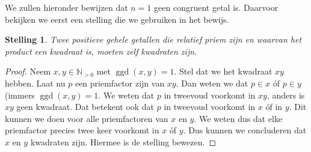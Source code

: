 \documentclass[12pt,reqno]{article}
\newcommand*{\NO}{\ensuremath{\mathbb{N}_{>0}}}
\theoremstyle{theorem}
\newtheorem{theorem}{Stelling}
\theoremstyle{definition}
\DeclareMathOperator{\ggd}{ggd}
\begin{document}
	We zullen hieronder bewijzen dat $n=1$ geen congruent getal is. Daarvoor bekijken we eerst een stelling die we gebruiken in het bewijs.
	\begin{theorem}\label{1:hulp}
		Twee positieve gehele getallen die relatief priem zijn en waarvan het product een kwadraat is, moeten zelf kwadraten zijn.
	\end{theorem}
	\begin{proof}
		Neem $x,y\in\NO$ met $\ggd(x,y) = 1$. Stel dat we het kwadraat $xy$ hebben. Laat nu $p$ een priemfactor zijn van $xy$. Dan weten we dat $p\in x$ \'of $p\in y$ (immers $\ggd(x,y)=1$. We weten dat $p$ in tweevoud voorkomt in $xy$, anders is $xy$ geen kwadraat. Dat betekent ook dat $p$ in tweevoud voorkomt in $x$ \'of in $y$. Dit kunnen we doen voor alle priemfactoren van $x$ en $y$. We weten dus dat elke priemfactor precies twee keer voorkomt in $x$ \'of $y$. Dus kunnen we concluderen dat $x$ en $y$ kwadraten zijn. Hiermee is de stelling bewezen.
	\end{proof}
	
\end{document}
